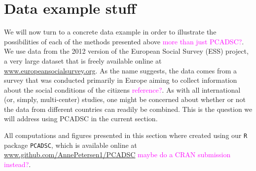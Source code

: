 \documentclass[titlepage,11pt,twoside]{article}
\newcommand{\hl}[1]{\textcolor{magenta}{#1}}
\newcommand{\R}[1]{\texttt{#1}}
\begin{document}
\section{Data example stuff}
\label{sec:dataexample}
We will now turn to a concrete data example in order to illustrate the possibilities of each of the methods presented above \hl{more than just PCADSC?}. We use data from the 2012 version of the European Social Survey (ESS) project, a very large dataset that is freely available online at \url{www.europeansocialsurvey.org}. As the name suggests, the data comes from a survey that was conducted primarily in Europe aiming to collect information about the social conditions of the citizens \hl{reference?}. As with all international (or, simply, multi-center) studies, one might be concerned about whether or not the data from different countries can readily be combined. This is the question we will address using PCADSC in the current section.

All computations and figures presented in this section where created using our \R{R} package \R{PCADSC}, which is available online at \url{www.github.com/AnnePetersen1/PCADSC} \hl{maybe do a CRAN submission instead?}.
\end{document}
